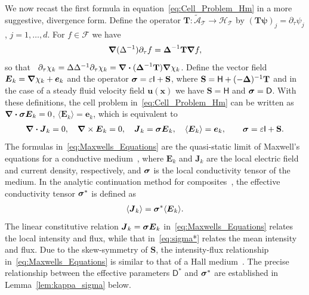 \documentclass[leqno,onefignum,onetabnum]{siamltex1213}
\newcommand{\lemref}[1]{Lemma~\ref{#1}}
\newcommand{\Tb}{\mathbf{T}}
\newcommand{\Sb}{\mathbf{S}}
\newcommand{\Tc}{\mathcal{T}}
\newcommand{\Hc}{\mathcal{H}}
\newcommand{\Ac}{\mathcal{A}}
\newcommand{\Dm}{\mathsf{D}}
\newcommand{\Hm}{\mathsf{H}}
\newcommand{\Ib}{\mathsf{I}}
\newcommand{\Fs}{\mathscr{F}}
\newcommand\bsig{\mbox{\boldmath${\sigma}$}}
\newcommand\bDelta{\mbox{\boldmath${\Delta}$}}
\newcommand\bnabla{\mbox{\boldmath${\nabla}$}}
\providecommand\bcdot{\boldsymbol{\cdot}}
\newcommand{\vecJ}{\boldsymbol{J}}
\newcommand{\vecE}{\boldsymbol{E}}
\newcommand{\vecx}{\boldsymbol{x}}
\newcommand{\vecu}{\boldsymbol{u}}
\newcommand{\vece}{\boldsymbol{e}}
\newcommand{\vecpsi}{\boldsymbol{\psi}}
\begin{document}
We now recast the first formula in equation~\eqref{eq:Cell_Problem_Hm}
in a more suggestive, divergence form. Define the operator
$\Tb:\tilde{\Ac}_{\Tc}\to\Hc_{\Tc}$ by $(\Tb\vecpsi)_j=\partial_\tau\psi_j$,
$j=1,\ldots,d$. For $f\in\Fs$ we
have~\cite{Fannjiang:1994:SIAM_JAM:333,Folland:99:RealAnalysis,Folland:95:PDEs}     
%
\begin{align}\label{eq:Dt_T}
  \bnabla(\Delta^{-1})\partial_\tau f=\bDelta^{-1}\Tb\bnabla f ,
\end{align}
%
so that~\cite{Fannjiang:1994:SIAM_JAM:333}
$\partial_\tau\chi_k=\Delta\Delta^{-1}\partial_\tau\chi_k=\bnabla \bcdot(\bDelta^{-1}\Tb)\bnabla \chi_k$. Define the  
vector field $\vecE_k=\bnabla \chi_k+\vece_k$ and the operator
$\bsig=\varepsilon\Ib+\Sb$, where
$\Sb=\Hm+(-\bDelta)^{-1}\Tb$ and in the case of a steady fluid velocity
field $\vecu(\vecx)$ we have $\Sb=\Hm$ and $\bsig=\Dm$. With these
definitions, the cell problem in~\eqref{eq:Cell_Problem_Hm} can be
written as $\bnabla\bcdot\bsig\vecE_k=0$, $\langle\vecE_k\rangle=\vece_k$, which
is equivalent to     
%
\begin{align}\label{eq:Maxwells_Equations}    
  \bnabla \bcdot\vecJ_k=0, \quad
  \bnabla \times\vecE_k=0, \quad
  \vecJ_k=\bsig\vecE_k,\quad
  \langle\vecE_k\rangle=\vece _k,\qquad
  \bsig%
       =\varepsilon\Ib+\Sb.
\end{align}
%
The formulas in~\eqref{eq:Maxwells_Equations} are the
quasi-static limit of Maxwell's equations for a conductive
medium~\cite{Golden:CMP-473,MILTON:2002:TC}, where $\vecE_k$ and
$\vecJ_k$ are the local electric field and current density,
respectively, and $\bsig$ is the local conductivity tensor of the
medium. In the analytic continuation method for
composites~\cite{Golden:CMP-473,Milton:APL-300,Bergman:PRC-377}, the
effective conductivity tensor $\bsig^*$ is defined as 
% 
\begin{align}\label{eq:sigma*}
  \langle\vecJ_k\rangle=\bsig^*\langle\vecE_k\rangle.
\end{align}
%
The linear constitutive relation $\vecJ_k=\bsig\vecE_k$
in~\eqref{eq:Maxwells_Equations} relates the local intensity and flux, 
while that in~\eqref{eq:sigma*} relates the mean intensity and
flux. Due to the skew-symmetry of $\Sb$, the intensity-flux
relationship in~\eqref{eq:Maxwells_Equations} is similar to that of a
Hall
medium~\cite{Isichenko:JNS:1991:375,Fannjiang:1994:SIAM_JAM:333}. The
precise relationship between the effective parameters $\Dm^*$ 
and $\bsig^*$ are established in \lemref{lem:kappa_sigma} below.
\end{document}
